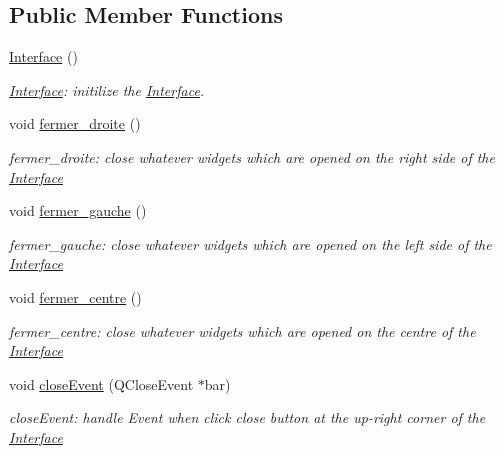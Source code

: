 \subsection*{Public Member Functions}
\begin{DoxyCompactItemize}
\item 
\mbox{\label{class_interface_a4406d74c75bdfe150bf72be1f1cda8b1}} 
\hyperlink{class_interface_a4406d74c75bdfe150bf72be1f1cda8b1}{Interface} ()
\begin{DoxyCompactList}\small\item\em \hyperlink{class_interface}{Interface}\+: initilize the \hyperlink{class_interface}{Interface}. \end{DoxyCompactList}\item 
\mbox{\label{class_interface_a72f663f65f2f4f0f1c0cc710206c844f}} 
void \hyperlink{class_interface_a72f663f65f2f4f0f1c0cc710206c844f}{fermer\+\_\+droite} ()
\begin{DoxyCompactList}\small\item\em fermer\+\_\+droite\+: close whatever widgets which are opened on the right side of the \hyperlink{class_interface}{Interface} \end{DoxyCompactList}\item 
\mbox{\label{class_interface_a82de37089406e4a81eae6b98d8c6f4e4}} 
void \hyperlink{class_interface_a82de37089406e4a81eae6b98d8c6f4e4}{fermer\+\_\+gauche} ()
\begin{DoxyCompactList}\small\item\em fermer\+\_\+gauche\+: close whatever widgets which are opened on the left side of the \hyperlink{class_interface}{Interface} \end{DoxyCompactList}\item 
\mbox{\label{class_interface_a0089c8fe1279b59d283bf9bd50b43912}} 
void \hyperlink{class_interface_a0089c8fe1279b59d283bf9bd50b43912}{fermer\+\_\+centre} ()
\begin{DoxyCompactList}\small\item\em fermer\+\_\+centre\+: close whatever widgets which are opened on the centre of the \hyperlink{class_interface}{Interface} \end{DoxyCompactList}\item 
void \hyperlink{class_interface_a5e55a321ae0f587fb2c1378aad7536cf}{close\+Event} (Q\+Close\+Event $\ast$bar)
\begin{DoxyCompactList}\small\item\em close\+Event\+: handle Event when click close button at the up-\/right corner of the \hyperlink{class_interface}{Interface} \end{DoxyCompactList}\end{DoxyCompactItemize}
